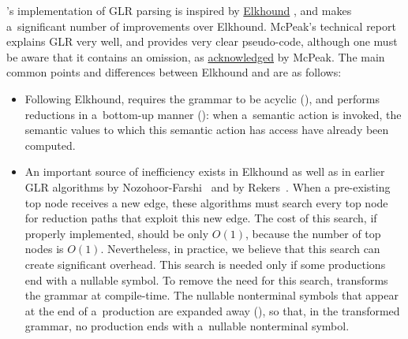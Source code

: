 \menhir's implementation of GLR parsing is inspired by
\href{https://scottmcpeak.com/elkhound/}{Elkhound}
\cite{mcpeak-02,mcpeak-necula-04},
and makes a~significant number of improvements over Elkhound.
McPeak's technical report~\cite{mcpeak-02}
explains GLR very well,
and provides very clear pseudo-code,
although one must be aware
that it contains an omission,
as \href{https://scottmcpeak.com/elkhound/reduceViaPath_bug.html}{acknowledged} by McPeak.
%
%
The main common points and differences between Elkhound and \menhir
are as follows:
\begin{itemize}

\item
Following Elkhound, \menhir requires the grammar to be acyclic (),
and performs reductions in a~bottom-up manner ():
when a~semantic action is invoked,
the semantic values to which this semantic action has access
have already been computed.


\item
An important source of inefficiency exists in Elkhound
as well as in earlier GLR algorithms by Nozohoor-Farshi~\cite{nozohoor-farshi-91}
and by Rekers~\cite{rekers-91}.
When a pre-existing top node receives a new edge,
these algorithms must search every top node
for reduction paths that exploit this new edge.
%
%
The cost of this search, if properly implemented, should be only $O(1)$,
because the number of top nodes is $O(1)$.
%
Nevertheless, in practice, we believe that this search can create
significant overhead.
%
This search is needed only if some productions
end with a nullable symbol.
%
To remove the need for this search,
\menhir transforms the grammar at compile-time.
The nullable nonterminal symbols that appear at the end of
a~production are expanded away (),
so that,
in the transformed grammar,
no production ends with a~nullable nonterminal symbol.


\end{itemize}
